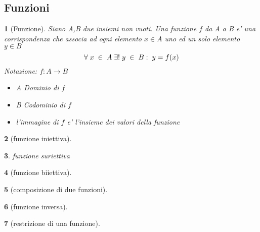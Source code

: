 \documentclass{article}
\theoremstyle{mystyle}
\newtheorem*{mydefinition}{}
\begin{document}
\subsection{Funzioni}
\begin{mydefinition}[Funzione]
    Siano A,B due insiemi non vuoti. Una funzione $f$ da A a B e' una corrispondenza che associa ad ogni elemento $x \in A$ uno ed un solo elemento $y \in B$
    $$\forall\hspace{1mm} x \hspace{1mm}\in\hspace{1mm} A\hspace{1mm} \exists ! \hspace{1mm}y \hspace{1mm}\in\hspace{1mm} B : \hspace{1mm}y=f(x)$$
    Notazione: $f:A\xrightarrow{}B$
    \begin{itemize}
        \item A Dominio di $f$
        \item B Codominio di $f$
        \item l'immagine di $f$ e' l'insieme dei valori della funzione
    \end{itemize}
\end{mydefinition}
\begin{mydefinition}[funzione iniettiva]
    
\end{mydefinition}
\begin{mydefinition}funzione suriettiva
    
\end{mydefinition}
\begin{mydefinition}[funzione biiettiva]
    
\end{mydefinition}
\begin{mydefinition}[composizione di due funzioni]
    
\end{mydefinition}
\begin{mydefinition}[funzione inversa]
    
\end{mydefinition}
\begin{mydefinition}[restrizione di una funzione]
    
\end{mydefinition}
\end{document}
